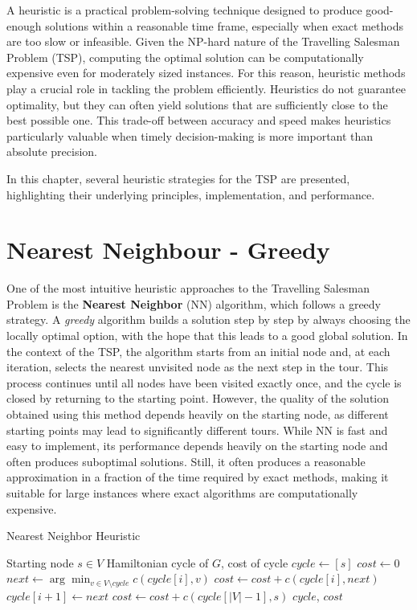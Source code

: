 A heuristic is a practical problem-solving technique designed to produce good-enough solutions within a reasonable time frame, 
especially when exact methods are too slow or infeasible. Given the NP-hard nature of the Travelling Salesman Problem (TSP), 
computing the optimal solution can be computationally expensive even for moderately sized instances. For this reason, heuristic methods 
play a crucial role in tackling the problem efficiently. Heuristics do not guarantee optimality, but they can often yield solutions 
that are sufficiently close to the best possible one. This trade-off between accuracy and speed makes heuristics particularly valuable 
when timely decision-making is more important than absolute precision.

In this chapter, several heuristic strategies for the TSP are presented, highlighting their underlying principles, implementation, and performance.

\section{Nearest Neighbour - Greedy}

One of the most intuitive heuristic approaches to the Travelling Salesman Problem is the \textbf{Nearest Neighbor} (NN) algorithm, which follows a greedy strategy. 
A \textit{greedy} algorithm builds a solution step by step by always choosing the locally optimal option, with the hope that this leads to a good global solution.
In the context of the TSP, the algorithm starts from an initial node and, at each iteration, selects the nearest unvisited node as the next step in the tour. 
This process continues until all nodes have been visited exactly once, and the cycle is closed by returning to the starting point.
However, the quality of the solution obtained using this method depends heavily on the starting node, as different starting points may lead to significantly 
different tours.
While NN is fast and easy to implement, its performance depends heavily on the starting node and often produces suboptimal solutions. Still, it often produces a reasonable approximation in a fraction of the time required by exact methods, making it suitable for large instances where exact algorithms are computationally expensive.

\begin{algorithm}
\caption{Nearest Neighbor Heuristic}
\begin{algorithmic}
  \Require Starting node $s \in V$
  \Ensure Hamiltonian cycle of $G$, cost of cycle
  \State $cycle \gets [s]$
  \State $cost \gets 0$
    \State $next \gets \arg\min_{v \in V \setminus cycle} c(cycle[i], v)$
    \State $cost \gets cost + c(cycle[i], next)$
    \State $cycle[i+1] \gets next$
  \EndFor
  \State $cost \gets cost + c(cycle[|V| - 1], s)$
  \State \Return $cycle$, $cost$
\end{algorithmic}
\end{algorithm}

